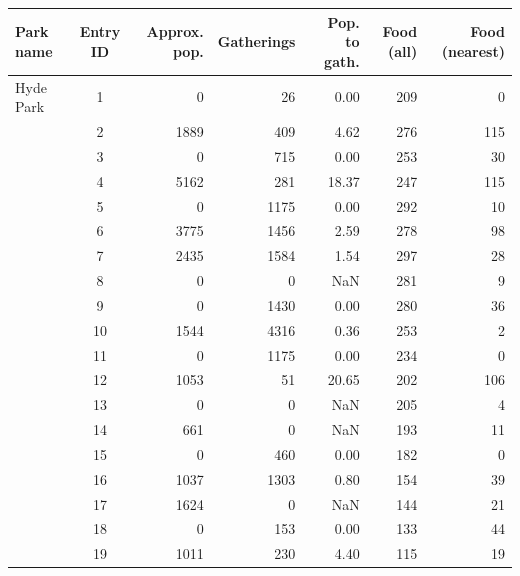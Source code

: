 \begin{table}[H]
\centering
\small
\begin{tabular}{lcrrrrr}
\toprule
Park name &  Entry ID &  Approx. pop. &  Gatherings &  Pop. to gath. & Food (all) & Food (nearest) \\
\midrule
Hyde Park &         1 &           0 &        26 &      0.00 &       209 &             0 \\
{} &         2 &        1889 &       409 &      4.62 &       276 &           115 \\
{} &         3 &           0 &       715 &      0.00 &       253 &            30 \\
{} &         4 &        5162 &       281 &     18.37 &       247 &           115 \\
{} &         5 &           0 &      1175 &      0.00 &       292 &            10 \\
{} &         6 &        3775 &      1456 &      2.59 &       278 &            98 \\
{} &         7 &        2435 &      1584 &      1.54 &       297 &            28 \\
{} &         8 &           0 &         0 &       NaN &       281 &             9 \\
{} &         9 &           0 &      1430 &      0.00 &       280 &            36 \\
{} &        10 &        1544 &      4316 &      0.36 &       253 &             2 \\
{} &        11 &           0 &      1175 &      0.00 &       234 &             0 \\
{} &        12 &        1053 &        51 &     20.65 &       202 &           106 \\
{} &        13 &           0 &         0 &       NaN &       205 &             4 \\
{} &        14 &         661 &         0 &       NaN &       193 &            11 \\
{} &        15 &           0 &       460 &      0.00 &       182 &             0 \\
{} &        16 &        1037 &      1303 &      0.80 &       154 &            39 \\
{} &        17 &        1624 &         0 &       NaN &       144 &            21 \\
{} &        18 &           0 &       153 &      0.00 &       133 &            44 \\
{} &        19 &        1011 &       230 &      4.40 &       115 &            19 \\

\end{tabular}
\end{table}
